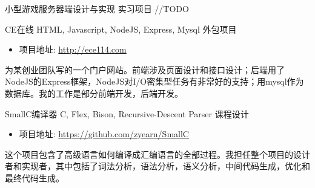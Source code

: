 \documentclass[11pt,a4paper]{moderncv}
\begin{document}
{小型游戏服务器端设计与实现}
{实习项目}
{}
{}
{
    //TODO
}
\vspace*{0.2\baselineskip}

{CE在线}
{HTML, Javascript, NodeJS, Express, Mysql}
{外包项目}
{}
{
\begin{itemize}
    \item 项目地址: \url{http://ece114.com}
\end{itemize}
为某创业团队写的一个门户网站。前端涉及页面设计和接口设计；后端用了NodeJS的Express框架，NodeJS对I/O密集型任务有非常好的支持；用mysql作为数据库。我的工作是部分前端开发，后端开发。\\
}
\vspace*{0.2\baselineskip}




{SmallC编译器}
{C, Flex, Bison, Recursive-Descent Parser}
{课程设计}
{}
{
\begin{itemize}
    \item 项目地址: \url{https://github.com/zyearn/SmallC}
\end{itemize}
这个项目包含了高级语言如何编译成汇编语言的全部过程。我担任整个项目的设计者和实现者，其中包括了词法分析，语法分析，语义分析，中间代码生成，优化和最终代码生成。\\
}
\vspace*{0.2\baselineskip}
\end{document}
